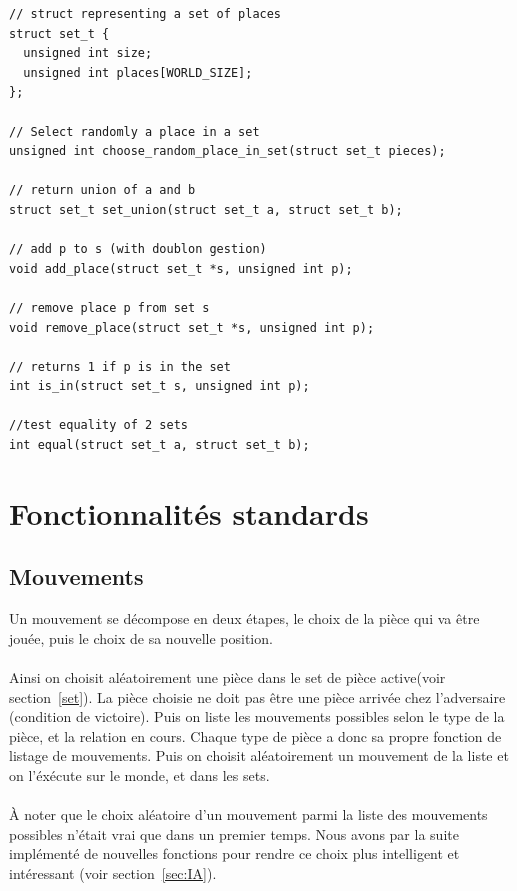 \documentclass{article}
\begin{document}
\begin{lstlisting}[caption=set\_t, label=lis:set]
// struct representing a set of places
struct set_t {
  unsigned int size;
  unsigned int places[WORLD_SIZE];
};

// Select randomly a place in a set
unsigned int choose_random_place_in_set(struct set_t pieces);

// return union of a and b
struct set_t set_union(struct set_t a, struct set_t b);

// add p to s (with doublon gestion)
void add_place(struct set_t *s, unsigned int p);

// remove place p from set s 
void remove_place(struct set_t *s, unsigned int p);

// returns 1 if p is in the set
int is_in(struct set_t s, unsigned int p);

//test equality of 2 sets
int equal(struct set_t a, struct set_t b);
\end{lstlisting}

\label{set}



\newpage
\section{Fonctionnalités standards}
\subsection{Mouvements}
Un mouvement se décompose en deux étapes, le choix de la pièce qui va être jouée, puis le choix de sa nouvelle position.
\\\\
Ainsi on choisit aléatoirement une pièce dans le set de pièce active(voir section~\ref{set}). La pièce choisie ne doit pas être une pièce arrivée
chez l'adversaire (condition de victoire). Puis on liste les mouvements possibles selon le 
type de la pièce, et la relation en cours. Chaque type de pièce a donc sa propre fonction de listage de mouvements. Puis on choisit aléatoirement
un mouvement de la liste et on l'éxécute sur le monde, et dans les sets.
\\\\
À noter que le choix aléatoire d'un mouvement parmi la liste des mouvements possibles n'était vrai que dans un premier temps. Nous avons par 
la suite implémenté de nouvelles fonctions pour rendre ce choix plus intelligent et intéressant (voir section~\ref{sec:IA}).
\end{document}
